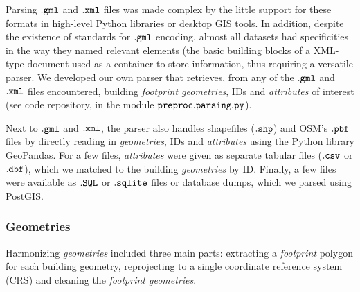 \documentclass[fleqn,10pt]{wlscirep}
\begin{document}
Parsing $\tt{.gml}$ and $\tt{.xml}$ files was made complex by the little support for these formats in high-level Python libraries or desktop GIS tools. In addition, despite the existence of standards for $\tt{.gml}$ encoding, almost all datasets had specificities in the way they named relevant elements (the basic building blocks of a XML-type document used as a container to store information, thus requiring a versatile parser. We developed our own parser that retrieves, from any of the $\tt{.gml}$ and $\tt{.xml}$ files encountered, building \textit{footprint geometries}, IDs and \textit{attributes} of interest (see code repository\cite{eubucco-0.2-code2022}, in the module $\tt{preproc.parsing.py}$). 

Next to $\tt{.gml}$ and $\tt{.xml}$, the parser also handles shapefiles ($\tt{.shp}$) and OSM's $\tt{.pbf}$ files by directly reading in \textit{geometries}, IDs and \textit{attributes} using the Python library GeoPandas\cite{kelsey_jordahl_2020_3946761}. For a few files, \textit{attributes} were given as separate tabular files ($\tt{.csv}$ or $\tt{.dbf}$), which we matched to the building \textit{geometries} by ID. Finally, a few files were available as $\tt{.SQL}$ or $\tt{.sqlite}$ files or database dumps, which we parsed using PostGIS.


\subsubsection*{Geometries} Harmonizing \textit{geometries} included three main parts: extracting a \textit{footprint} polygon for each building geometry, reprojecting to a single coordinate reference system (CRS) and cleaning the \textit{footprint geometries}.
\end{document}
